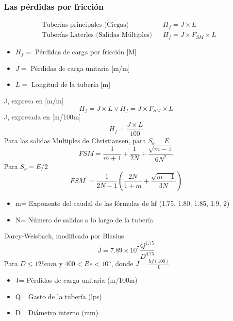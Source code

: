 \subsubsection{Las pérdidas por fricción}
\begin{align*}
    &\text{Tuberías principales (Ciegas)}&& H_f = J \times L\\
    &\text{Tuberías Laterles (Salidas Múltiples)}&& H_f= J \times F_{SM} \times L
\end{align*}
\begin{notation}
    \begin{itemize}
        \item $H_f =$ Pérdidas de carga por fricción [M]
        \item $J=$ Pérdidas de carga unitaria [m/m]
        \item $L=$ Longitud de la tubería [m]
    \end{itemize}
\end{notation}
J, expresa en [m/m]
\begin{equation}
    H_f = J \times L\lor H_f = J \times F_{SM} \times L
\end{equation}
J, expresada en [m/100m]
\begin{equation}
    H_f = \frac{J \times L}{100}
\end{equation}
Para las salidas Multiples de Christiansen, para $S_o=E$
\begin{equation}
    FSM = \frac{1}{m + 1} + \frac{1}{2N} + \frac{\sqrt{m - 1}}{6N^2} 
\end{equation}
Para $S_o= E/2$
\begin{equation}
    FSM^{\prime} = \frac{1}{2N - 1}\left(\frac{2N}{1 + m} + \frac{\sqrt{m - 1}}{3N}  \right)
\end{equation}
\begin{notation}
    \begin{itemize}
        \item m= Exponente del caudal de las fórmulas de hf (1.75, 1.80, 1.85, 1.9, 2)
        \item N= Número de salidas a lo largo de la tubería
    \end{itemize}
\end{notation}
Darcy-Weisbach, modificado por Blasius
\begin{equation}
    J = 7.89 \times 10^7 \frac{Q^{1.75}}{D^{4.75}}
\end{equation}
Para $D\leq 125mm$ y $400<Re<10^5$, donde $J=\frac{hf(100)}{L}$
\begin{notation}
    \begin{itemize}
        \item J= Pérdidas de carga unitaria (m/100m)
        \item Q= Gasto de la tubería (lps)
        \item D= Diámetro interno (mm)
    \end{itemize}
\end{notation}
